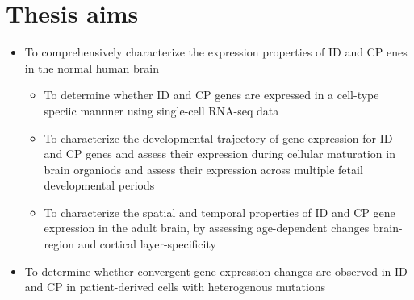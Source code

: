 \documentclass[12pt]{article}
\begin{document}
\section{Thesis aims}

\begin{itemize}
    \item To comprehensively characterize the expression properties of ID and CP enes in the normal human brain
    \begin{itemize}
        \item To determine whether ID and CP genes are expressed in a cell-type speciic mannner using single-cell RNA-seq data
        \item To characterize the developmental trajectory of gene expression for ID and CP genes and assess their expression during cellular maturation in brain organiods and assess their expression across multiple fetail developmental periods 
        \item  To characterize the spatial and temporal properties of ID and CP gene expression in the adult brain, by assessing age-dependent changes  brain-region and cortical layer-specificity 
        
    \end{itemize}

    \item To determine whether convergent gene expression changes are observed in ID and CP in patient-derived cells with heterogenous mutations 

\end{itemize}
\end{document}
